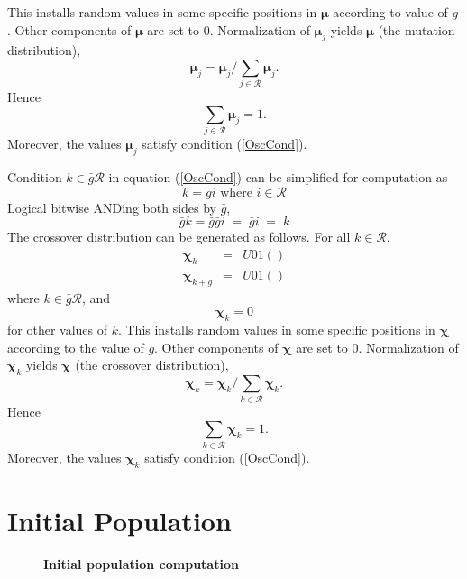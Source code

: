 This installs random values in some specific positions in $\bm{\mu}$ according to value of $g$. Other components of $\bm{\mu}$ are set to $0$. 
Normalization of $\bm{\mu}_j$ yields $\bm{\mu}$ (the mutation distribution),
\[
\bm{\mu}_j = \bm{\mu}_j / \sum \limits_{j \in \mathcal{R} } \bm{\mu}_j.
\]
Hence 
\[
\sum \limits_{j \in \mathcal{R} } \bm{\mu}_j = 1.
\]
Moreover, the values $\bm{\mu}_j$ satisfy condition (\ref{OscCond}).

Condition $k \in \bar{g} \mathcal{R}$ in equation (\ref{OscCond}) can be simplified for computation as
\[
k = \bar{g} i  \text{ where $i \in \mathcal{R}$}
\]
Logical bitwise ANDing both sides by $\bar{g}$,
\begin{equation*}
\bar{g} k = \bar{g} \bar{g} i \; = \; \bar{g} i \; = \; k 
\end{equation*}
The crossover distribution can be generated as follows.
For all $k \in \mathcal{R}$,
\begin{eqnarray*}
\bm{\chi}_k & = & U01() \\
\bm{\chi}_{k+g} & = & U01() 
\end{eqnarray*}
where $k \in \bar{g} \mathcal{R}$, and
\[
\bm{\chi}_k = 0
\]
for other values of $k$. 
This installs random values in some specific positions in $\bm{\chi}$ according to the value of $g$. 
Other components of $\bm{\chi}$ are set to $0$. Normalization of $\bm{\chi}_k$ yields 
$\bm{\chi}$ (the crossover distribution),
\[
\bm{\chi}_k = \bm{\chi}_k/\sum\limits_{k \in \mathcal{R}} \bm{\chi}_k.
\]
Hence 
\[
\sum\limits_{k \in \mathcal{R}} \bm{\chi}_k = 1.
\]
Moreover, the values $\bm{\chi}_k$ satisfy condition (\ref{OscCond}).

\section{Initial Population}
\label{InitPopOsc}

\begin{figure}[H]
\begin{center}
\hspace{4pt}
\caption{\textbf{Initial population computation} }
\label{initialpop}
\end{center}
\end{figure}

